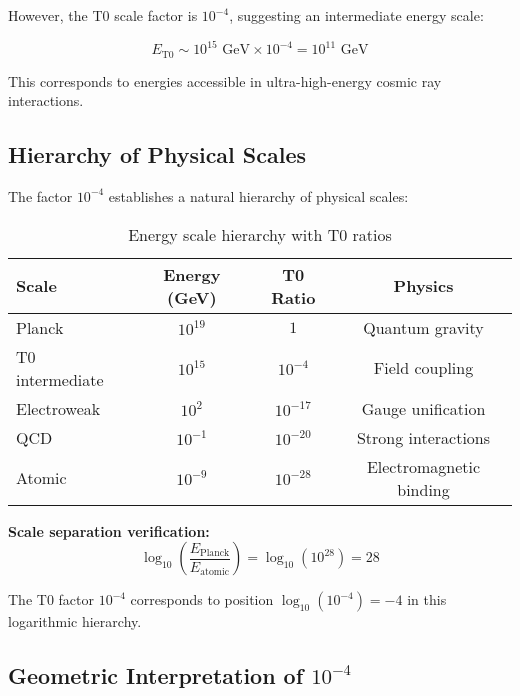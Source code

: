 \documentclass[12pt,a4paper]{report}
\begin{document}
	However, the T0 scale factor is $10^{-4}$, suggesting an intermediate energy scale:
	
	\begin{equation}
		E_{\text{T0}} \sim 10^{15} \text{ GeV} \times 10^{-4} = 10^{11} \text{ GeV}
	\end{equation}
	
	This corresponds to energies accessible in ultra-high-energy cosmic ray interactions.
	
	\subsection{Hierarchy of Physical Scales}
	\label{subsec:hierarchy_scales}
	
	The factor $10^{-4}$ establishes a natural hierarchy of physical scales:
	
	\begin{table}[htbp]
		\centering
		\begin{tabular}{lccc}
			\toprule
			\textbf{Scale} & \textbf{Energy (GeV)} & \textbf{T0 Ratio} & \textbf{Physics} \\
			\midrule
			Planck & $10^{19}$ & $1$ & Quantum gravity \\
			T0 intermediate & $10^{15}$ & $10^{-4}$ & Field coupling \\
			Electroweak & $10^{2}$ & $10^{-17}$ & Gauge unification \\
			QCD & $10^{-1}$ & $10^{-20}$ & Strong interactions \\
			Atomic & $10^{-9}$ & $10^{-28}$ & Electromagnetic binding \\
			\bottomrule
		\end{tabular}
		\caption{Energy scale hierarchy with T0 ratios}
		\label{tab:energy_hierarchy}
	\end{table}
	
	\textbf{Scale separation verification:}
	\begin{equation}
		\log_{10}\left(\frac{E_{\text{Planck}}}{E_{\text{atomic}}}\right) = \log_{10}(10^{28}) = 28
	\end{equation}
	
	The T0 factor $10^{-4}$ corresponds to position $\log_{10}(10^{-4}) = -4$ in this logarithmic hierarchy.
	
	\subsection{Geometric Interpretation of $10^{-4}$}
	\label{subsec:geometric_interpretation}
	
\end{document}
